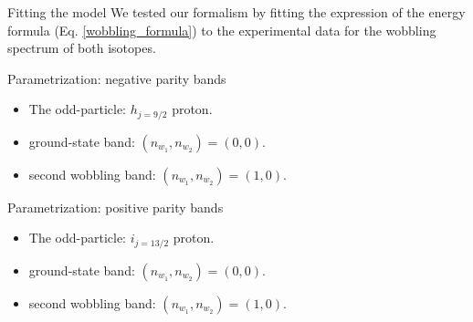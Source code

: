 \documentclass{beamer}
\begin{document}
\begin{frame}{Fitting the model}
    We tested our formalism by fitting the expression of the energy formula (Eq. \ref{wobbling_formula}) to the experimental data for the wobbling spectrum of both isotopes.
    \begin{block}{Parametrization: negative parity bands}
    \begin{itemize}
    \item The odd-particle: $h_{j=9/2}$ proton.
    \item ground-state band: $(n_{w_1},n_{w_2})=(0,0)$.
    \item second wobbling band: $(n_{w_1},n_{w_2})=(1,0)$.
    \end{itemize}
    \end{block}
    \begin{block}{Parametrization: positive parity bands}
    \begin{itemize}
    \item The odd-particle: $i_{j=13/2}$ proton.
    \item ground-state band: $(n_{w_1},n_{w_2})=(0,0)$.
    \item second wobbling band: $(n_{w_1},n_{w_2})=(1,0)$.
    \end{itemize}
    \end{block}
\end{frame}
\end{document}
